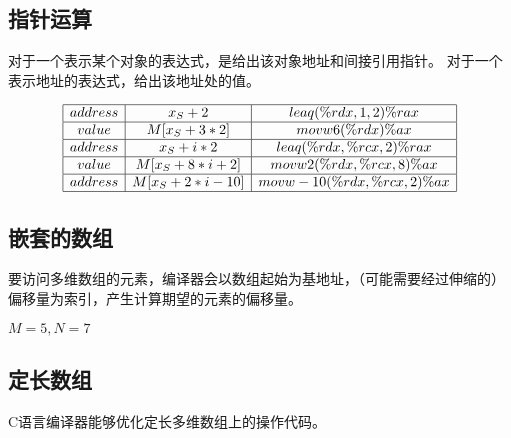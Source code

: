 {    \subsection{指针运算}
    {
        对于一个表示某个对象的表达式，是给出该对象地址和间接引用指针。
        对于一个表示地址的表达式，给出该地址处的值。

        \begin{practicec}
            \begin{table}[htb]
                \centering

                \[
                    \begin{array}{|c|c|c|}
                        \hline
                        address & x_S + 2 & leaq (\%rdx, 1, 2) \%rax \\
                        \hline
                        value & M[x_S + 3 * 2] & movw 6(\%rdx) \%ax \\
                        \hline
                        address & x_S + i * 2 & leaq (\%rdx, \%rcx, 2) \%rax \\
                        \hline
                        value & M[x_S + 8 * i + 2] & movw 2(\%rdx, \%rcx, 8) \%ax \\
                        \hline
                        address & M[x_S + 2 * i - 10] & movw -10(\%rdx, \%rcx, 2) \%ax \\
                        \hline
                    \end{array}
                \]
            \end{table}
        \end{practicec}
    }

    \subsection{嵌套的数组}
    {
        要访问多维数组的元素，编译器会以数组起始为基地址，（可能需要经过伸缩的）偏移量为索引，产生计算期望的元素的偏移量。

        \begin{practicec}
            $M = 5, N = 7$
        \end{practicec}
    }

    \subsection{定长数组}
    {
        C语言编译器能够优化定长多维数组上的操作代码。

}}
